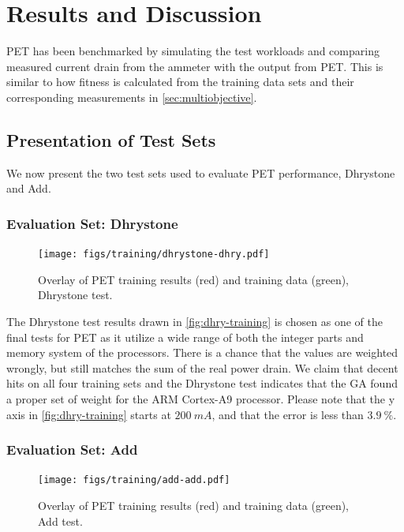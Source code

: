 \section{Results and Discussion}

PET has been benchmarked by simulating the test workloads and comparing measured
current drain from the ammeter with the output from PET. This is similar to how
fitness is calculated from the training data sets and their corresponding
measurements in \autoref{sec:multiobjective}.


\subsection{Presentation of Test Sets}

We now present the two test sets used to evaluate PET performance, Dhrystone and
Add.

\subsubsection{Evaluation Set: Dhrystone}

\begin{figure}[H]
\centering
\texttt{[image: figs/training/dhrystone-dhry.pdf]}
\caption{Overlay of PET training results (red) and training data (green),
Dhrystone test.}
\label{fig:dhry-training}
\end{figure}

The Dhrystone test results drawn in \autoref{fig:dhry-training} is chosen as one
of the final tests for PET as it utilize a wide range of both the integer parts
and memory system of the processors. There is a chance that the values are
weighted wrongly, but still matches the sum of the real power drain. We claim
that decent hits on all four training sets and the Dhrystone test indicates that
the GA found a proper set of weight for the ARM Cortex-A9 processor. Please note
that the y axis in \autoref{fig:dhry-training} starts at $200~mA$, and that the
error is less than $3.9~\%$.


\newpage

\subsubsection{Evaluation Set: Add}

\begin{figure}[ht]
\centering
\texttt{[image: figs/training/add-add.pdf]}
\caption{Overlay of PET training results (red) and training data (green), Add
test.}
\label{fig:add-training}
\end{figure}

